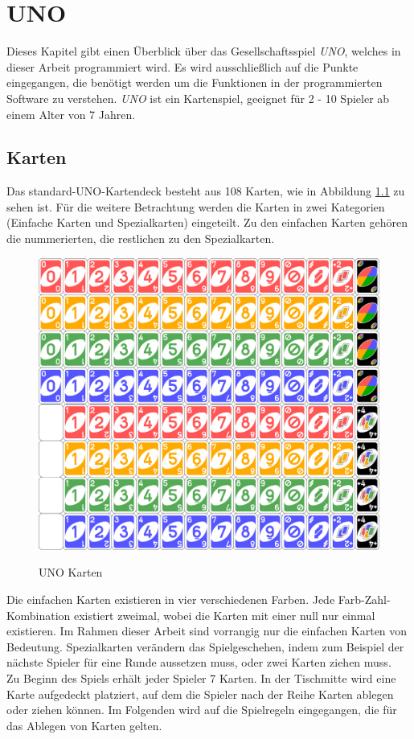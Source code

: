 
\chapter{UNO}
\label{ch:uno}
Dieses Kapitel gibt einen Überblick über das Gesellschaftsspiel \textit{UNO}, welches in dieser Arbeit programmiert wird. Es wird ausschließlich auf die Punkte eingegangen, die benötigt werden um die Funktionen in der programmierten Software zu verstehen. \textit{UNO} ist ein Kartenspiel, geeignet für 2 - 10 Spieler ab einem Alter von 7 Jahren. 
\section{Karten}
\label{ch:karten}
Das standard-UNO-Kartendeck besteht aus 108 Karten, wie in Abbildung \ref{fig:uno_cards} zu sehen ist. Für die weitere Betrachtung werden die Karten in zwei Kategorien (Einfache Karten und Spezialkarten) eingeteilt. Zu den einfachen Karten gehören die nummerierten, die restlichen zu den Spezialkarten. 
\begin{figure}[h]
\begin{center}
	\includegraphics[width=.5\linewidth]{bilder/UNO_cards_deck.png}
	\caption{UNO Karten}
	\label{fig:uno_cards}
\end{center}
\end{figure}
Die einfachen Karten existieren in vier verschiedenen Farben. Jede Farb-Zahl-Kombination existiert zweimal, wobei die Karten mit einer null nur einmal existieren. Im Rahmen dieser Arbeit sind vorrangig nur die einfachen Karten von Bedeutung. Spezialkarten verändern das Spielgeschehen, indem zum Beispiel der nächste Spieler für eine Runde aussetzen muss, oder zwei Karten ziehen muss. \\
Zu Beginn des Spiels erhält jeder Spieler 7 Karten. In der Tischmitte wird eine Karte aufgedeckt platziert, auf dem die Spieler nach der Reihe Karten ablegen oder ziehen können. Im Folgenden wird auf die Spielregeln eingegangen, die für das Ablegen von Karten gelten.
